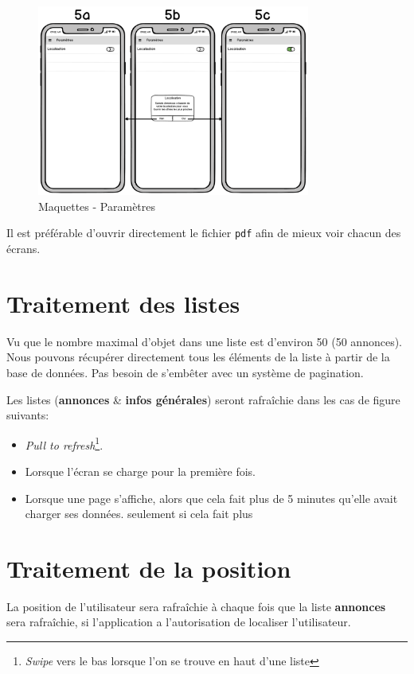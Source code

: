 \documentclass[french]{report}
\begin{document}
\begin{figure}[H]
    \centering
    \includegraphics[width=0.8\textwidth]{../mocks/5.pdf}
    \caption{Maquettes - Paramètres}
    \label{fig:mockups_partners}
\end{figure}

Il est préférable d'ouvrir directement le fichier \verb|pdf| afin de mieux voir
chacun des écrans.

\section{Traitement des listes}
Vu que le nombre maximal d'objet dans une liste est d'environ 50 (50 annonces).
Nous pouvons récupérer directement tous les éléments de la liste à partir de la base
de données. Pas besoin de s'embêter avec un système de pagination.

Les listes (\textbf{annonces} \& \textbf{infos générales}) seront rafraîchie dans 
les cas de figure suivants:
\begin{itemize}
    \item \textit{Pull to refresh}\footnote{\textit{Swipe} vers le bas lorsque l'on
    se trouve en haut d'une liste}.
    \item Lorsque l'écran se charge pour la première fois.
    \item Lorsque une page s'affiche, alors que cela fait plus de 5 minutes qu'elle
    avait charger ses données.
    seulement si cela fait plus 
\end{itemize}

\section{Traitement de la position}
La position de l'utilisateur sera rafraîchie à chaque fois que la liste \textbf{annonces}
sera rafraîchie, si l'application a l'autorisation de localiser l'utilisateur.
\end{document}
